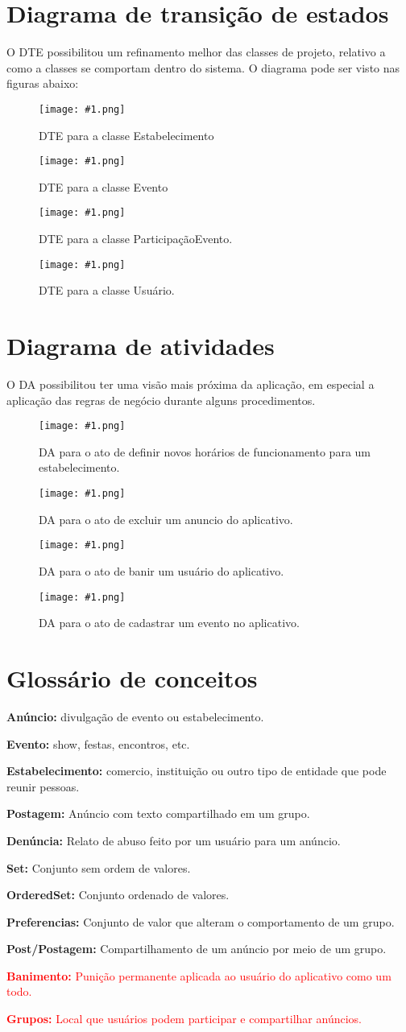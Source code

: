 \documentclass{article}
\newcommand{\diagrama}[2]
{
 \begin{figure}[H]
 \begin{center}
 \texttt{[image: \#1.png]}
 \end{center}
 \caption{#2}
 \label{fig:#1}
 \end{figure}
}
\begin{document}
\section{Diagrama de transição de estados}
O DTE possibilitou um refinamento melhor das classes de projeto, relativo a como a classes se comportam dentro do sistema. O diagrama pode ser visto nas figuras abaixo:

\diagrama{dte_estabelecimento}{DTE para a classe Estabelecimento}
\diagrama{dte_evento}{DTE para a classe Evento}
\diagrama{dte_participacaoevento}{DTE para a classe ParticipaçãoEvento.}
\diagrama{dte_usuario}{DTE para a classe Usuário.}

\section{Diagrama de atividades}
O DA possibilitou ter uma visão mais próxima da aplicação, em especial a aplicação das regras de negócio durante alguns procedimentos.
\diagrama{atv_definirhorarios}{DA para o ato de definir novos horários de funcionamento para um estabelecimento.}
\diagrama{atv_excluiranuncio}{DA para o ato de excluir um anuncio do aplicativo.}
\diagrama{atv_banirusuario}{DA para o ato de banir um usuário do aplicativo.}
\diagrama{atv_cadastrarevento}{DA para o ato de cadastrar um evento no aplicativo.}

\section{Glossário de conceitos}
    
\begin{enumerate}[label=\textbf{\arabic*}]
\item \textbf{Anúncio:} divulgação de evento ou estabelecimento.
\item \textbf{Evento:} show, festas, encontros, etc.
\item \textbf{Estabelecimento:} comercio, instituição ou outro tipo de entidade que pode reunir pessoas.
\item \textbf{Postagem:} Anúncio com texto compartilhado em um grupo.
\item \textbf{Denúncia:} Relato de abuso feito por um usuário para um anúncio.
\item \textbf{Set:} Conjunto sem ordem de valores.
\item \textbf{OrderedSet:} Conjunto ordenado de valores.
\item \textbf{Preferencias:} Conjunto de valor que alteram o comportamento de um grupo.
\item \textbf{Post/Postagem:} Compartilhamento de um anúncio por meio de um grupo.
\textcolor{red}{
\item \textbf{Banimento:} Punição permanente aplicada ao usuário do aplicativo como um todo.
\item \textbf{Grupos:} Local que usuários podem participar e compartilhar anúncios.
}
\end{enumerate}
\end{document}
